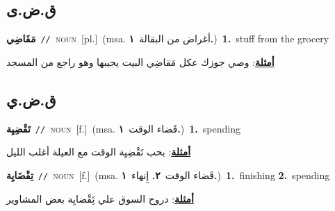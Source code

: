 \documentclass[10pt,a4paper,twoside]{article} %
\begin{document}
\begin{multicols}{2}
\vspace{-3mm}
\subsection*{\color{blue}\foreignlanguage{arabic}{ق.ض.ى}\color{blue}{}} 

{\setlength\topsep{0pt}\textbf{\foreignlanguage{arabic}{مَقَاضِي}}\ {\color{gray}\texttt{//}\color{black}}\ \textsc{noun}\ [pl.]\ \color{gray}(msa. \foreignlanguage{arabic}{أغراض من البقالة}~\foreignlanguage{arabic}{\textbf{١.}})\color{black}\ \textbf{1.}~stuff from the grocery\  \begin{flushright}\color{gray}\foreignlanguage{arabic}{\textbf{\underline{\foreignlanguage{arabic}{أمثلة}}}: وصي جوزك عكل مَقاضِي البيت يجيبها وهو راجع من المسجد}\end{flushright}\color{black}} \vspace{2mm}

\vspace{-3mm}
\subsection*{\color{blue}\foreignlanguage{arabic}{ق.ض.ي}\color{blue}{}} 

{\setlength\topsep{0pt}\textbf{\foreignlanguage{arabic}{تَقْضِيِة}}\ {\color{gray}\texttt{//}\color{black}}\ \textsc{noun}\ [f.]\ \color{gray}(msa. \foreignlanguage{arabic}{قَضاء الوقت}~\foreignlanguage{arabic}{\textbf{١.}})\color{black}\ \textbf{1.}~spending\  \begin{flushright}\color{gray}\foreignlanguage{arabic}{\textbf{\underline{\foreignlanguage{arabic}{أمثلة}}}: بحب تَقْضِيِة الوقت مع العيلة أغلب الليل}\end{flushright}\color{black}} \vspace{2mm}

{\setlength\topsep{0pt}\textbf{\foreignlanguage{arabic}{تِقْضَايِة}}\ {\color{gray}\texttt{//}\color{black}}\ \textsc{noun}\ [f.]\ \color{gray}(msa. \foreignlanguage{arabic}{قَضاء الوقت}~\foreignlanguage{arabic}{\textbf{٢.}}  \foreignlanguage{arabic}{إِنهاء}~\foreignlanguage{arabic}{\textbf{١.}})\color{black}\ \textbf{1.}~finishing  \textbf{2.}~spending\  \begin{flushright}\color{gray}\foreignlanguage{arabic}{\textbf{\underline{\foreignlanguage{arabic}{أمثلة}}}: دروح السوق علي تَِقْضايِة بعض المشاوير}\end{flushright}\color{black}} \vspace{2mm}


\end{multicols}
\end{document}
